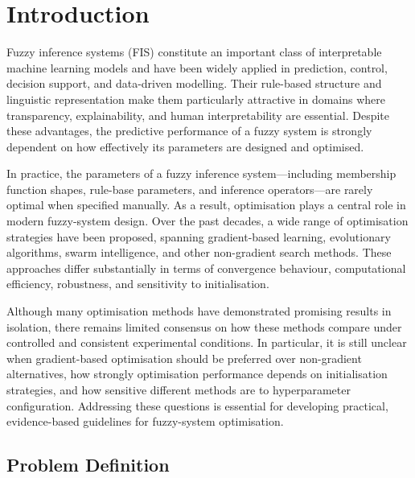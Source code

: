 \documentclass[a4paper,12pt,oneside]{article}
\begin{document}
\newpage

\tableofcontents
\newpage


\section{Introduction}

Fuzzy inference systems (FIS) constitute an important class of interpretable machine learning models and have been widely applied in prediction, control, decision support, and data-driven modelling. Their rule-based structure and linguistic representation make them particularly attractive in domains where transparency, explainability, and human interpretability are essential. Despite these advantages, the predictive performance of a fuzzy system is strongly dependent on how effectively its parameters are designed and optimised.

In practice, the parameters of a fuzzy inference system---including membership function shapes, rule-base parameters, and inference operators---are rarely optimal when specified manually. As a result, optimisation plays a central role in modern fuzzy-system design. Over the past decades, a wide range of optimisation strategies have been proposed, spanning gradient-based learning, evolutionary algorithms, swarm intelligence, and other non-gradient search methods. These approaches differ substantially in terms of convergence behaviour, computational efficiency, robustness, and sensitivity to initialisation.

Although many optimisation methods have demonstrated promising results in isolation, there remains limited consensus on how these methods compare under controlled and consistent experimental conditions. In particular, it is still unclear when gradient-based optimisation should be preferred over non-gradient alternatives, how strongly optimisation performance depends on initialisation strategies, and how sensitive different methods are to hyperparameter configuration. Addressing these questions is essential for developing practical, evidence-based guidelines for fuzzy-system optimisation.

\subsection{Problem Definition}
\end{document}

